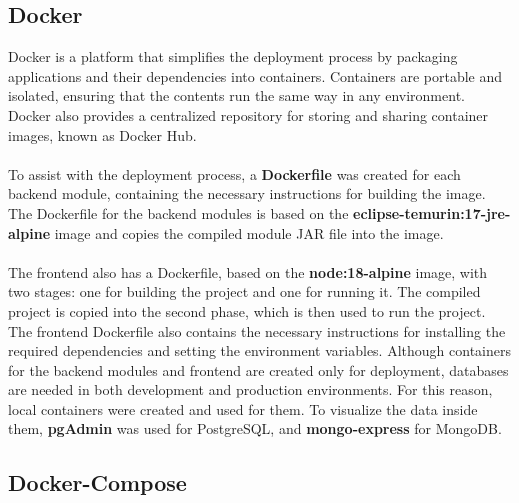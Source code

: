 \subsection{Docker}

\noindent Docker is a platform that simplifies the deployment process by packaging applications and their dependencies into containers. Containers are portable and isolated, ensuring that the contents run the same way in any environment. Docker also provides a centralized repository for storing and sharing container images, known as Docker Hub.
\\\\
\noindent To assist with the deployment process, a \textbf{Dockerfile} was created for each backend module, containing the necessary instructions for building the image. The Dockerfile for the backend modules is based on the \textbf{eclipse-temurin:17-jre-alpine} image and copies the compiled module JAR file into the image.
\\\\
\noindent The frontend also has a Dockerfile, based on the \textbf{node:18-alpine} image, with two stages: one for building the project and one for running it. The compiled project is copied into the second phase, which is then used to run the project. The frontend Dockerfile also contains the necessary instructions for installing the required dependencies and setting the environment variables.
\newpage
\noindent Although containers for the backend modules and frontend are created only for deployment, databases are needed in both development and production environments. For this reason, local containers were created and used for them. To visualize the data inside them, \textbf{pgAdmin} was used for PostgreSQL, and \textbf{mongo-express} for MongoDB.

\subsection{Docker-Compose}

